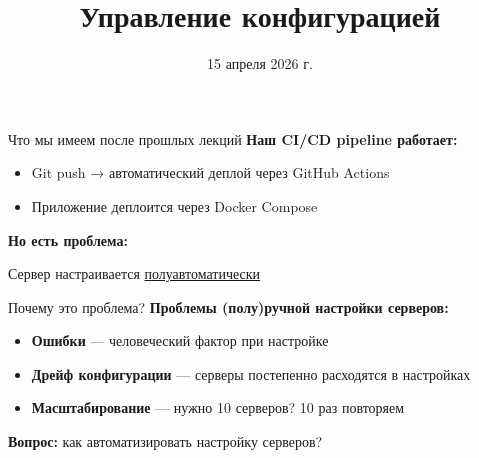 \documentclass[aspectratio=169]{beamer}
\title{Управление конфигурацией}
\date{15 апреля 2026 г.}
\begin{document}
    \maketitle

    \begin{frame}{Что мы имеем после прошлых лекций}
        \textbf{Наш CI/CD pipeline работает:}
        
        \begin{itemize}
            \item Git push → автоматический деплой через GitHub Actions
            \item Приложение деплоится через Docker Compose
        \end{itemize}

        \textbf{Но есть проблема:}

        Сервер настраивается \href{https://github.com/prafdin/devops-demo-website/tree/docker-compose-demo}{полуавтоматически}
    \end{frame}

    \begin{frame}{Почему это проблема?}
        \textbf{Проблемы (полу)ручной настройки серверов:}
        
        \begin{itemize}
            \item \textbf{Ошибки} — человеческий фактор при настройке
            \item \textbf{Дрейф конфигурации} — серверы постепенно расходятся в настройках
            \item \textbf{Масштабирование} — нужно 10 серверов? 10 раз повторяем
        \end{itemize}
        
        \vspace{0.5cm}
        
        \textbf{Вопрос:} как автоматизировать настройку серверов?
    \end{frame}
\end{document}
